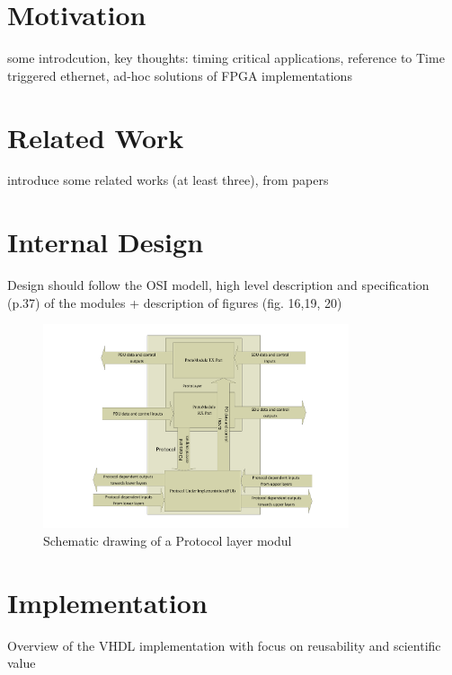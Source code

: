 \documentclass[conference]{IEEEtran}
\begin{document}



\section{Motivation}\label{sec:Motivation}

some introdcution, key thoughts: timing critical applications, reference to Time triggered ethernet, ad-hoc solutions of FPGA implementations 

\section{Related Work}\label{sec:RelatedWork}

introduce some related works (at least three), from papers 

\section{Internal Design}\label{sec:Internal Design}

Design should follow the OSI modell, high level description and specification (p.37) of the modules + description of figures
(fig. 16,19, 20)

\begin{figure}[!htb]
    \centering
    \includegraphics[width=9cm]{figures_raw/protlayer_2.pdf}
    \caption{Schematic drawing of a Protocol layer modul}
    \label{fig:proto_layer_sch}
\end{figure}

\section{Implementation}\label{sec:Implementation}

Overview of the VHDL implementation with focus on reusability and scientific value
\end{document}
